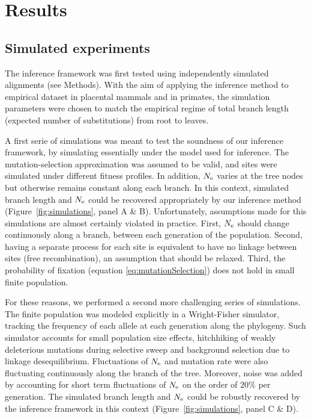 \section{Results}
\label{sec:Results}

\subsection{Simulated experiments}
\label{sec:ResultsSimulated}
The inference framework was first tested using independently simulated alignments (see Methods).
With the aim of applying the inference method to empirical dataset in placental mammals and in primates, the simulation parameters were chosen to match the empirical regime of total branch length (expected number of substitutions) from root to leaves.

A first serie of simulations was meant to test the soundness of our inference framework, by simulating essentially under the model used for inference.
The mutation-selection approximation was assumed to be valid, and sites were simulated under different fitness profiles.
In addition, $N_{\mathrm{e}}$ varies at the tree nodes but otherwise remains constant along each branch.
In this context, simulated branch length and $N_{\mathrm{e}}$ could be recovered appropriately by our inference method (Figure~\ref{fig:simulations}, panel A \& B).
Unfortunately, assumptions made for this simulations are almost certainly violated in practice.
First, $N_{\mathrm{e}}$ should change continuously along a branch, between each generation of the population.
Second, having a separate process for each site is equivalent to have no linkage between sites (free recombination), an assumption that should be relaxed. 
Third, the probability of fixation (equation \ref{eq:mutationSelection}) does not hold in small finite population.

For these reasons, we performed a second more challenging series of simulations.
The finite population was modeled explicitly in a Wright-Fisher simulator, tracking the frequency of each allele at each generation along the phylogeny.
Such simulator accounts for small population size effects, hitchhiking of weakly deleterious mutations during selective sweep and background selection due to linkage desequilibrium.
Fluctuations of $N_{\mathrm{e}}$ and mutation rate were also fluctuating continuously along the branch of the tree.
Moreover, noise was added by accounting for short term fluctuations of $N_{\mathrm{e}}$ on the order of $20\%$ per generation.
The simulated branch length and $N_{\mathrm{e}}$ could be robustly recovered by the inference framework in this context (Figure~\ref{fig:simulations}, panel C \& D).

